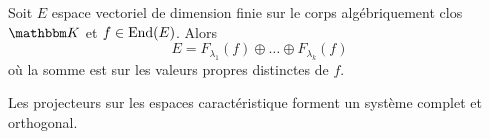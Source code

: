 \begin{theorem}     \label{ThoSpectraluRMLok}
    Soit \( E\) espace vectoriel de dimension finie sur le corps algébriquement clos \( \eK\) et \( f\in\operatorname{End}(E)\). Alors
    \begin{equation}    \label{EqCTFHooBSGhYK}
        E=F_{\lambda_1}(f)\oplus\ldots\oplus F_{\lambda_k}(f)
    \end{equation}
    où la somme est sur les valeurs propres distinctes de \( f\).

    Les projecteurs sur les espaces caractéristique forment un système complet et orthogonal.
\end{theorem}

